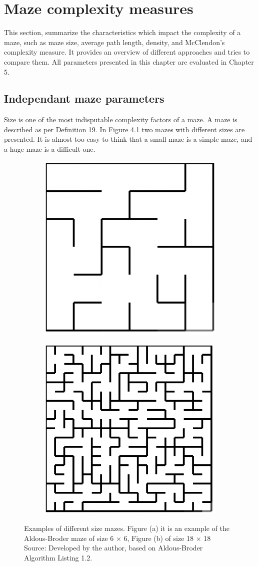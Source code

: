 \section{Maze complexity measures}
This section, summarize the characteristics which impact the complexity of a maze, such as maze size, average path length, density, and McClendon's complexity measure. It provides an overview of different approaches and tries to compare them. All parameters presented in this chapter are evaluated in Chapter 5.\\
\subsection{Independant maze parameters}
Size is one of the most indisputable complexity factors of a maze. A maze is described as per Definition 19. In Figure 4.1 two mazes with different sizes are
presented. It is almost too easy to think that a small maze is a simple maze, and a huge maze is a difficult one.\\
\begin{figure}[!h]
    \centering
    \begin{subfigure}{.5\textwidth}
    \centering
    \includegraphics[width=.5\linewidth]{66}
    \caption{}
\label{fig:sub1}
    \end{subfigure}%
    \begin{subfigure}{.5\textwidth}
    \centering
    \includegraphics[width=.5\linewidth]{1818}
    \caption{}
\label{fig:sub2}
    \end{subfigure}
    \caption{Examples of different size mazes. Figure (a) it is an example of the Aldous-Broder maze of size 6 $\times$ 6, Figure (b) of size 18 $\times$ 18 \\ Source: Developed by the author, based on Aldous-Broder Algorithm Listing 1.2. }
\label{fig:test}
\end{figure}
